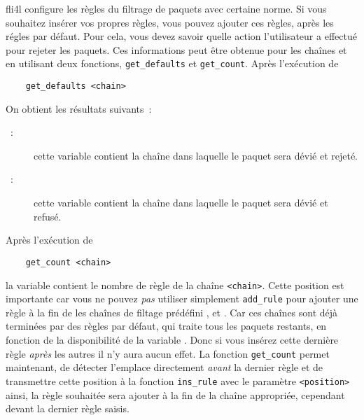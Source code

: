 fli4l configure les règles du filtrage de paquets avec certaine norme. Si vous
souhaitez insérer vos propres règles, vous pouvez ajouter ces règles, après
les régles par défaut. Pour cela, vous devez savoir quelle action l’utilisateur
a effectué pour rejeter les paquets. Ces informations peut être obtenue pour 
les chaînes  et  en utilisant deux fonctions,
\texttt{get\_defaults} et \texttt{get\_count}. Après l'exécution de

\begin{example}
\begin{verbatim}
    get_defaults <chain>
\end{verbatim}
\end{example}

On obtient les résultats suivants~:

\begin{description}
\item[~:] cette variable contient la chaîne dans laquelle le paquet
  sera dévié et rejeté.
\item[~:] cette variable contient la chaîne dans laquelle le paquet
  sera dévié et refusé.
\end{description}

Après l'exécution de

\begin{example}
\begin{verbatim}
    get_count <chain>
\end{verbatim}
\end{example}

la variable  contient le nombre de règle de la chaîne \texttt{<chain>}.
Cette position est importante car vous ne pouvez \emph{pas} utiliser simplement
\texttt{add\_rule} pour ajouter une règle à la fin de les chaînes de \og{}filtage\fg{}
prédéfini ,  et . Car ces chaînes
sont déjà terminées par des règles par défaut, qui traite tous les paquets restants,
en fonction de la disponibilité de la variable . Donc si
vous insérez cette dernière règle \emph{après} les autres il n'y aura aucun effet.
La fonction \texttt{get\_count} permet maintenant, de détecter l'emplace directement
\emph{avant} la dernier règle et de transmettre cette position à la fonction
\texttt{ins\_rule} avec le paramètre \texttt{<position>} ainsi, la règle souhaitée
sera ajouter à la fin de la chaîne appropriée, cependant devant la dernier règle saisis. 

